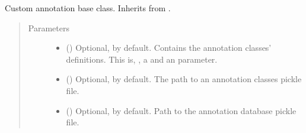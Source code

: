 \documentclass[letterpaper,10pt,english]{sphinxmanual}
\begin{document}

\begin{fulllineitems}
\label{\detokenize{reference:pypath.annot.Cpad}}
\end{fulllineitems}


\begin{fulllineitems}
\label{\detokenize{reference:pypath.annot.CustomAnnotation}}
Custom annotation base class. Inherits from
.
\begin{quote}\begin{description}
\item[{Parameters}] \leavevmode\begin{itemize}
\item {} 
 () \textendash{} Optional,  by default. Contains the annotation classes’
definitions. This is, , a  and an
 parameter.

\item {} 
 () \textendash{} Optional,  by default. The path to an annotation classes
pickle file.

\item {} 
 () \textendash{} Optional,  by default. Path to the annotation database
pickle file.

\end{itemize}


\end{description}
\end{quote}
\end{fulllineitems}
\end{document}
